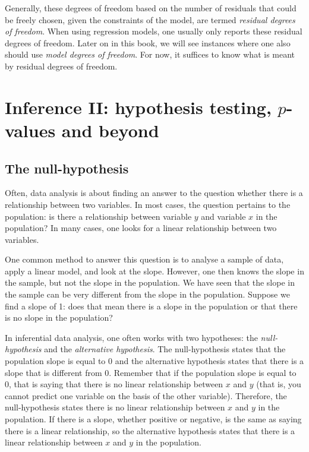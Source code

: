 \documentclass[]{book}\usepackage[]{graphicx}\usepackage[]{color}
\begin{document}
Generally, these degrees of freedom based on the number of residuals that could be freely chosen, given the constraints of the model, are termed \textit{residual degrees of freedom}. When using regression models, one usually only reports these residual degrees of freedom. Later on in this book, we will see instances where one also should use \textit{model degrees of freedom}. For now, it suffices to know what is meant by residual degrees of freedom.




\chapter{Inference II: hypothesis testing, $p$-values and beyond}\label{chap:hypothesis}

\section{The null-hypothesis}

Often, data analysis is about finding an answer to the question whether there is a relationship between two variables. In most cases, the question pertains to the population: is there a relationship between variable $y$ and variable $x$ in the population? In many cases, one looks for a linear relationship between two variables.

One common method to answer this question is to analyse a sample of data, apply a linear model, and look at the slope. However, one then knows the slope in the sample, but not the slope in the population. We have seen that the slope in the sample can be very different from the slope in the population. Suppose we find a slope of 1: does that mean there is a slope in the population or that there is no slope in the population?

In inferential data analysis, one often works with two hypotheses: the \textit{null-hypothesis} and the \textit{alternative hypothesis}. The null-hypothesis states that the population slope is equal to 0 and the alternative hypothesis states that there is a slope that is different from 0. Remember that if the population slope is equal to 0, that is saying that there is no linear relationship between $x$ and $y$ (that is, you cannot predict one variable on the basis of the other variable). Therefore, the null-hypothesis states there is no linear relationship between $x$ and $y$ in the population. If there is a slope, whether positive or negative, is the same as saying there is a linear relationship, so the alternative hypothesis states that there is a linear relationship between $x$ and $y$ in the population.
\end{document}
